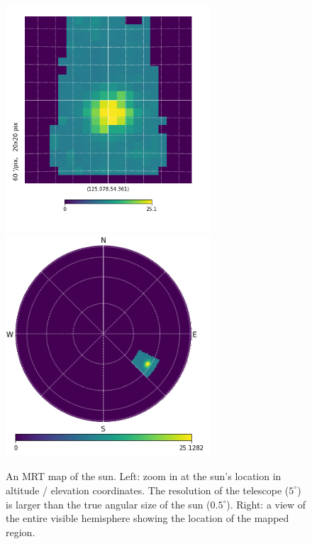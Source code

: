 \documentclass[11pt,letterpaper]{spie}
\begin{document}
\begin{figure}[h]
\centering
\includegraphics[width=3in]{mrt_sun_gnom.png}
\includegraphics[width=3in]{mrt_sun_orth.png}
\vspace{5pt}
\caption{An MRT map of the sun.  Left: zoom in at the sun's location in altitude / elevation coordinates.   The resolution of the telescope ($5^\circ$) is larger than the true angular size of the sun ($0.5^\circ$).  Right: a view of the entire visible hemisphere showing the location of the mapped region.}
\label{fig:Sun}
\end{figure}
\end{document}
